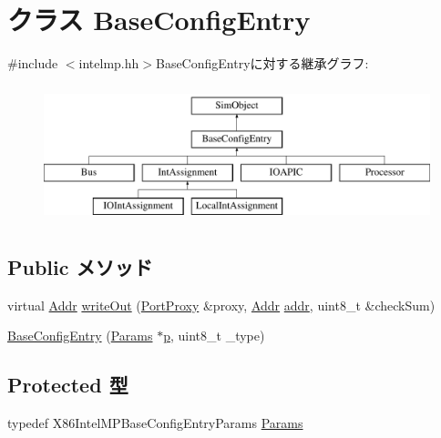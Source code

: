 \hypertarget{classX86ISA_1_1IntelMP_1_1BaseConfigEntry}{
\section{クラス BaseConfigEntry}
\label{classX86ISA_1_1IntelMP_1_1BaseConfigEntry}
}


{\ttfamily \#include $<$intelmp.hh$>$}BaseConfigEntryに対する継承グラフ:\begin{figure}[H]
\begin{center}
\leavevmode
\includegraphics[height=4cm]{classX86ISA_1_1IntelMP_1_1BaseConfigEntry}
\end{center}
\end{figure}
\subsection*{Public メソッド}
\begin{DoxyCompactItemize}
\item 
virtual \hyperlink{base_2types_8hh_af1bb03d6a4ee096394a6749f0a169232}{Addr} \hyperlink{classX86ISA_1_1IntelMP_1_1BaseConfigEntry_a5fffc1006b1f28bd779d83ffbe213b4f}{writeOut} (\hyperlink{classPortProxy}{PortProxy} \&proxy, \hyperlink{base_2types_8hh_af1bb03d6a4ee096394a6749f0a169232}{Addr} \hyperlink{namespaceX86ISA_ab705917f60c5566f9ce56a93f798b2e2}{addr}, uint8\_\-t \&checkSum)
\item 
\hyperlink{classX86ISA_1_1IntelMP_1_1BaseConfigEntry_a94ebdf4167f2bdf065904a1f008add9a}{BaseConfigEntry} (\hyperlink{classX86ISA_1_1IntelMP_1_1BaseConfigEntry_a94814126eb2e681fbf4837ed24d18616}{Params} $\ast$\hyperlink{namespaceX86ISA_af675c1d542a25b96e11164b80809a856}{p}, uint8\_\-t \_\-type)
\end{DoxyCompactItemize}
\subsection*{Protected 型}
\begin{DoxyCompactItemize}
\item 
typedef X86IntelMPBaseConfigEntryParams \hyperlink{classX86ISA_1_1IntelMP_1_1BaseConfigEntry_a94814126eb2e681fbf4837ed24d18616}{Params}
\end{DoxyCompactItemize}
